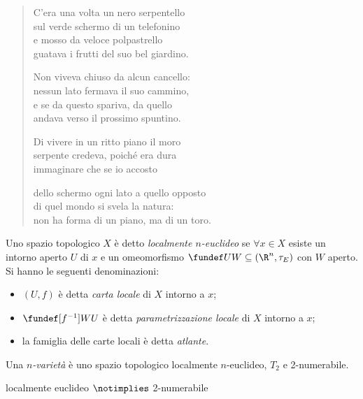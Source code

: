 
\begin{verse}
C'era una volta un nero serpentello\\
sul verde schermo di un telefonino\\
e mosso da veloce polpastrello\\
guatava i frutti del suo bel giardino.

Non viveva chiuso da alcun cancello:\\
nessun lato fermava il suo cammino,\\
e se da questo spariva, da quello\\
andava verso il prossimo spuntino.

Di vivere in un ritto piano il moro\\
serpente credeva, poiché era dura\\
immaginare che se io accosto

dello schermo ogni lato a quello opposto\\
di quel mondo si svela la natura:\\
non ha forma di un piano, ma di un toro.
\end{verse}


\begin{defn}
	Uno spazio topologico $X$ è detto \emph{localmente $n$-euclideo} se
	$\forall x \in X$ esiste un intorno aperto $U$ di $x$
	e un omeomorfismo $\fundef UW \subseteq (\R^n, \tau _E)$ con $W$ aperto.
	Si hanno le seguenti denominazioni:
	\begin{itemize}
		\item $(U,f)$ è detta \emph{carta locale} di $X$ intorno a $x$;
		\item $\fundef [f^{-1}] WU$ è detta \emph{parametrizzazione locale} di $X$ intorno a $x$;
		\item la famiglia delle carte locali è detta \emph{atlante}.
	\end{itemize}
\end{defn}

\begin{defn}[Varietà]
	Una \emph{$n$-varietà} è uno spazio topologico localmente $n$-euclideo, $T_2$ e 2-numerabile.
\end{defn}

\begin{prop}
	localmente euclideo $\notimplies$ 2-numerabile
\end{prop}

